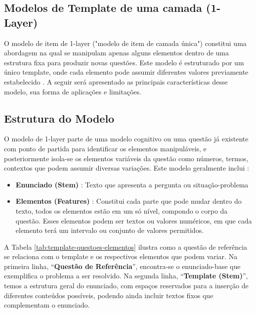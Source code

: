\subsection{Modelos de Template de uma camada (1-Layer)}

O modelo de item de 1-layer ("modelo de item de camada única") constitui uma abordagem na qual se manipulam apenas alguns elementos dentro de uma estrutura fixa para produzir novas questões. Este modelo é estruturado por um único template, onde cada elemento pode assumir diferentes valores previamente estabelecido \parencite{lai2013}. A seguir será apresentado as principais características desse modelo, sua forma de aplicações e limitações.

\subsection{Estrutura do Modelo}

O modelo de 1-layer parte de uma modelo cognitivo ou uma questão já existente com ponto de partida para identificar os elementos manipuláveis, e posteriormente isola-se os elementos variáveis da questão como números, termos, contextos que podem assumir diversas variações. Este modelo geralmente inclui : 

\begin{itemize}
    \item \textbf{Enunciado (Stem)} : Texto que apresenta a pergunta ou situação-problema
    \item \textbf{Elementos (Features)} : Constitui cada parte que pode mudar dentro do texto, todos os elementos estão em um só nível, compondo o corpo da questão. Esses elementos podem ser textos ou valores numéricos, em que cada elemento terá um intervalo ou conjunto de valores permitidos.
\end{itemize}

A Tabela \ref{tab:template-questoes-elementos} ilustra como a questão de referência se relaciona com o template e os respectivos elementos que podem variar. Na primeira linha, “\textbf{Questão de Referência}”, encontra-se o enunciado-base que exemplifica o problema a ser resolvido. Na segunda linha, “\textbf{Template (Stem)}”, temos a estrutura geral do enunciado, com espaços reservados para a inserção de diferentes conteúdos possíveis, podendo ainda incluir textos fixos que complementam o enunciado.

